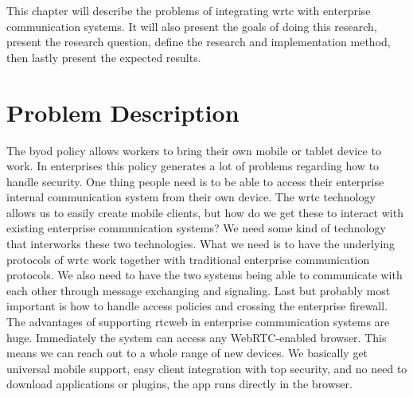 
This chapter will describe the problems of integrating \gls{wrtc} with enterprise communication systems. It will also present the goals of doing this research, present the research question, define the research and implementation method, then lastly present the expected results.

\section{Problem Description}
The \gls{byod} policy allows workers to bring their own mobile or tablet device to work. In enterprises this policy generates a lot of problems regarding how to handle security. One thing people need is to be able to access their enterprise internal communication system from their own device. The \gls{wrtc} technology allows us to easily create mobile clients, but how do we get these to interact with existing enterprise communication systems? We need some kind of technology that interworks these two technologies. What we need is to have the underlying protocols of \gls{wrtc} work together with traditional enterprise communication protocols. We also need to have the two systems being able to communicate with each other through message exchanging and signaling. Last but probably most important is how to handle access policies and crossing the enterprise firewall. The advantages of supporting \gls{rtcweb} in enterprise communication systems are huge. Immediately the system can access any WebRTC-enabled browser. This means we can reach out to a whole range of new devices. We basically get universal mobile support, easy client integration with top security, and no need to download applications or plugins, the app runs directly in the browser.






